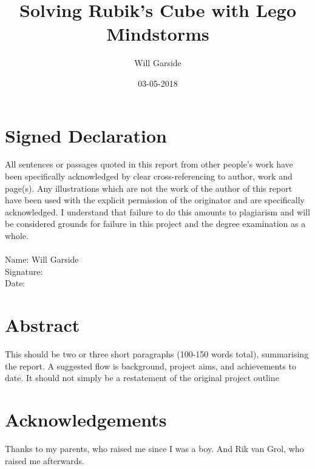 \documentclass{report}
\title{Solving Rubik's Cube with Lego Mindstorms}
\date{03-05-2018}
\author{Will Garside}
\begin{document}
		
	\maketitle
	\newpage

	\renewcommand{\thechapter}{\Roman{chapter}}
	\chapter{Signed Declaration}
	All sentences or passages quoted in this report from other people's work have been specifically acknowledged by clear cross-referencing to author, work and page(s). Any illustrations which are not the work of the author of this report have been used with the explicit permission of the originator and are specifically acknowledged. I understand that failure to do this amounts to plagiarism and will be considered grounds for failure in this project and the degree examination as a whole.
	\\
	\\Name: Will Garside
	\\Signature:
	\\Date: 

	\newpage
	\chapter{Abstract}
	This should be two or three short paragraphs (100-150 words total), summarising the report. A suggested flow is background, project aims, and achievements to date. It should not simply be a restatement of the original project outline
	
	\newpage
	\chapter{Acknowledgements}
	Thanks to my parents, who raised me since I was a boy. And Rik van Grol, who raised me afterwards.
	
	\newpage
\end{document}
